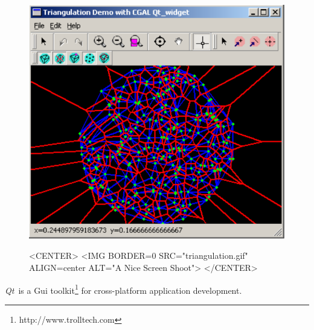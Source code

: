 

\newcommand{\qt}{{\em Qt}}      %

\gdef\lciIfHtmlClassLinks{\lcFalse}
\gdef\lciIfHtmlRefLinks{\lcFalse}
\gdef\lciIfHtmlLinks{\lcFalse}


\begin{figure}[h]
\begin{ccTexOnly}
\begin{center}
\includegraphics{Qt_widget/triangulation} 
\end{center}
\end{ccTexOnly}
\begin{ccHtmlOnly}
<CENTER>
<IMG BORDER=0 SRC="triangulation.gif"  ALIGN=center  ALT="A Nice Screen Shoot">
</CENTER>
\end{ccHtmlOnly}
\end{figure}

\qt\ is a {\sc Gui} toolkit\footnote{http://www.trolltech.com} for
cross-platform application development. 

